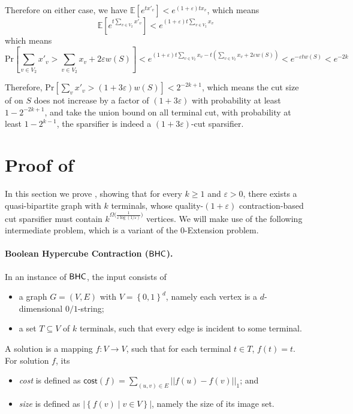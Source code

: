 \documentclass[11pt]{article}
\theoremstyle{definition}
\newcommand{\set}[1]{\left\{ #1 \right\}}
\newcommand{\eps}{{\varepsilon}}
\newcommand\vol{\mathsf{cost}}
\def\pr#1{\mathrm{Pr}\left[ #1 \right]}
\def\ex#1{{\mathbb{E}}\left[ #1 \right]}
\begin{document}
Therefore on either case, we have $\ex{e^{tx'_v}}<e^{(1+\eps)tx_v}$, which means 
$$\ex{e^{t\sum_{v\in V_2} x'_v}} < e^{(1+\eps)t\sum_{v\in V_2} x_v}$$ 
which means 
$$
\pr{\sum_{v\in V_2} x'_v > \sum_{v\in V_2} x_v + 2\eps w(S)} < e^{(1+\eps)t\sum_{v\in V_2} x_v-t(\sum_{v \in V_2} x_v + 2\eps w(S))}<e^{-\eps t w(S)}<e^{-2k}
$$

Therefore, $\pr{\sum_v x'_v > (1+3\eps)w(S)} < 2^{-2k+1}$, which means the cut size of on $S$ does not increase by a factor of $(1+3\eps)$ with probability at least $1-2^{-2k+1}$, and take the union bound on all terminal cut, with probability at least $1-2^{k-1}$, the sparsifier is indeed a $(1+3\eps)$-cut sparsifier.

\fi
 
\section{Proof of }
\label{sec: lower}

In this section we prove , showing that for every $k\ge 1$ and $\eps>0$, there exists a quasi-bipartite graph with $k$ terminals, whose quality-$(1+\eps)$ contraction-based cut sparsifier must contain $k^{\Omega\big(\frac{1}{\eps \log(1/\eps)}\big)}$ vertices. We will make use of the following intermediate problem, which is a variant of the $0$-Extension problem.

\newcommand{\bhc}{\textnormal{\textsf{BHC}}}

\paragraph{Boolean Hypercube Contraction ($\bhc$).}
In an instance of $\bhc$, the input consists of
\begin{itemize}
	\item a graph $G=(V,E)$ with $V=\set{0,1}^d$, namely each vertex is a $d$-dimensional $0/1$-string;
	\item a set $T\subseteq V$ of $k$ terminals, such that every edge is incident to some terminal.
\end{itemize}
A solution is a mapping $f:V\to V$, such that for each terminal $t\in T$, $f(t)=t$. For solution $f$, its
\begin{itemize}
\item \emph{cost} is defined as $\vol(f)=\sum_{(u,v)\in E}||f(u)-f(v)||_1$; and
\item \emph{size} is defined as $|\set{f(v)\mid v\in V}|$, namely the size of its image set.
\end{itemize}
\end{document}
